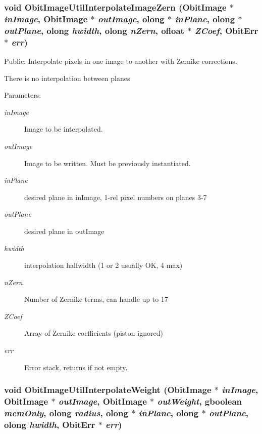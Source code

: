 \subsubsection{\setlength{\rightskip}{0pt plus 5cm}void Obit\-Image\-Util\-Interpolate\-Image\-Zern ({\bf Obit\-Image} $\ast$ {\em in\-Image}, {\bf Obit\-Image} $\ast$ {\em out\-Image}, {\bf olong} $\ast$ {\em in\-Plane}, {\bf olong} $\ast$ {\em out\-Plane}, {\bf olong} {\em hwidth}, {\bf olong} {\em n\-Zern}, {\bf ofloat} $\ast$ {\em ZCoef}, {\bf Obit\-Err} $\ast$ {\em err})}\label{ObitImageUtil_8h_a7}


Public: Interpolate pixels in one image to another with Zernike corrections. 

There is no interpolation between planes \begin{Desc}
\item[Parameters:]
\begin{description}
\item[{\em in\-Image}]Image to be interpolated. \item[{\em out\-Image}]Image to be written. Must be previously instantiated. \item[{\em in\-Plane}]desired plane in in\-Image, 1-rel pixel numbers on planes 3-7 \item[{\em out\-Plane}]desired plane in out\-Image \item[{\em hwidth}]interpolation halfwidth (1 or 2 usually OK, 4 max) \item[{\em n\-Zern}]Number of Zernike terms, can handle up to 17 \item[{\em ZCoef}]Array of Zernike coefficients (piston ignored) \item[{\em err}]Error stack, returns if not empty. \end{description}
\end{Desc}
\subsubsection{\setlength{\rightskip}{0pt plus 5cm}void Obit\-Image\-Util\-Interpolate\-Weight ({\bf Obit\-Image} $\ast$ {\em in\-Image}, {\bf Obit\-Image} $\ast$ {\em out\-Image}, {\bf Obit\-Image} $\ast$ {\em out\-Weight}, gboolean {\em mem\-Only}, {\bf olong} {\em radius}, {\bf olong} $\ast$ {\em in\-Plane}, {\bf olong} $\ast$ {\em out\-Plane}, {\bf olong} {\em hwidth}, {\bf Obit\-Err} $\ast$ {\em err})}\label{ObitImageUtil_8h_a8}


